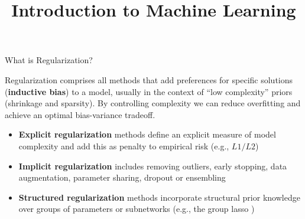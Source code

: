 \documentclass[11pt,compress,t,notes=noshow, xcolor=table]{beamer}
\title{Introduction to Machine Learning}
\begin{document}



\begin{vbframe}{What is Regularization?}

Regularization comprises all methods that add preferences for specific solutions (\textbf{inductive bias}) to a model, usually in the context of ``low complexity'' priors (shrinkage and sparsity). By controlling complexity we can reduce overfitting and achieve an optimal bias-variance tradeoff.
\vspace{0.1cm}
\begin{itemize}
\setlength{\itemsep}{1.0em}
    \item \textbf{Explicit regularization} methods define an explicit measure of model complexity and add this as penalty to empirical risk (e.g., $L1/L2$)
    \item \textbf{Implicit regularization} includes removing outliers, early stopping, data augmentation, parameter sharing, dropout or ensembling
    \item \textbf{Structured regularization} methods incorporate structural prior knowledge over groups of parameters or subnetworks (e.g., the group lasso )
\end{itemize}

\end{vbframe}
\end{document}
